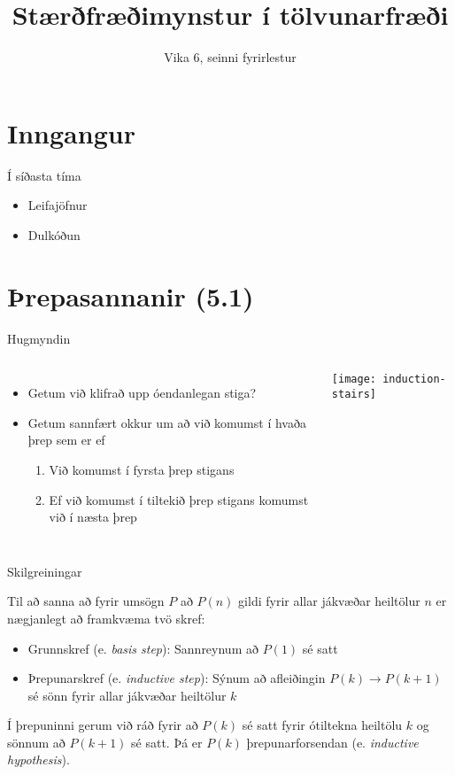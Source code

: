 \documentclass[handout]{beamer}
\title{Stærðfræðimynstur í tölvunarfræði}
\subtitle{Vika 6, seinni fyrirlestur}
\begin{document}
\begin{frame}
\titlepage
\end{frame}


\section{Inngangur}

\begin{frame}{Í síðasta tíma}
    \begin{itemize}
        \item Leifajöfnur
        \item Dulkóðun
    \end{itemize}
\end{frame}

\section{Þrepasannanir (5.1)}

\begin{frame}{Hugmyndin}
    \begin{columns}
        \begin{itemize}
            \item Getum við klifrað upp óendanlegan stiga?
            \item Getum sannfært okkur um að við komumst í hvaða þrep sem er ef
            \begin{enumerate}
                \item Við komumst í fyrsta þrep stigans
                \item Ef við komumst í tiltekið þrep stigans komumst við í næsta þrep
            \end{enumerate}
        \end{itemize}
        \begin{center}
            \texttt{[image: induction-stairs]}
        \end{center}
    \end{columns}
\end{frame}

\begin{frame}{Skilgreiningar}
    \begin{tcolorbox}[title=Sönnun með þrepun]
        Til að sanna að fyrir umsögn $P$ að $P(n)$ gildi fyrir allar jákvæðar heiltölur $n$ er nægjanlegt að framkvæma tvö skref:
        \begin{itemize}
            \item Grunnskref (e. \emph{basis step}): Sannreynum að $P(1)$ sé satt
            \item Þrepunarskref (e. \emph{inductive step}): Sýnum að afleiðingin $P(k) \to P(k+1)$ sé sönn fyrir allar jákvæðar heiltölur $k$
        \end{itemize}
    \end{tcolorbox}
    Í þrepuninni gerum við ráð fyrir að $P(k)$ sé satt fyrir ótiltekna heiltölu $k$ og sönnum að $P(k+1)$ sé satt. Þá er $P(k)$ þrepunarforsendan (e. \emph{inductive hypothesis}).
\end{frame}
\end{document}
